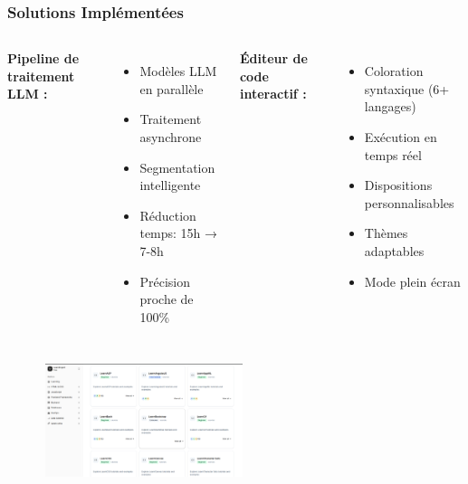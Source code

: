 \documentclass{beamer}
\begin{document}
\begin{frame}
\frametitle{Solutions Implémentées}
\begin{columns}
\textbf{Pipeline de traitement LLM :}
\begin{itemize}
    \item Modèles LLM en parallèle
    \item Traitement asynchrone
    \item Segmentation intelligente
    \item Réduction temps: 15h → 7-8h
    \item Précision proche de 100\%
\end{itemize}

\textbf{Éditeur de code interactif :}
\begin{itemize}
    \item Coloration syntaxique (6+ langages)
    \item Exécution en temps réel
    \item Dispositions personnalisables
    \item Thèmes adaptables
    \item Mode plein écran
\end{itemize}
\end{columns}

\vspace{0.3cm}
\begin{center}
    \includegraphics[width=0.6\textwidth,height=3.3cm,keepaspectratio]{week_3_img/Screenshot 2025-05-20 164411.png}
\end{center}
\end{frame}
\end{document}
